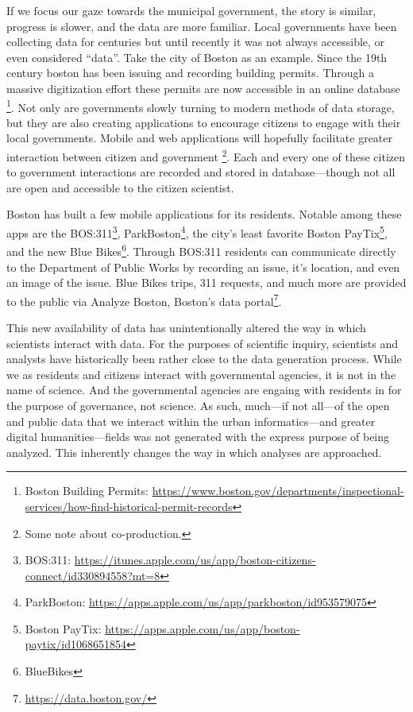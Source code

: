 \documentclass[
]{book}
\begin{document}
If we focus our gaze towards the municipal government, the story is similar, progress is slower, and the data are more familiar. Local governments have been collecting data for centuries but until recently it was not always accessible, or even considered ``data''. Take the city of Boston as an example. Since the 19th century boston has been issuing and recording building permits. Through a massive digitization effort these permits are now accessible in an online database \footnote{Boston Building Permits: \url{https://www.boston.gov/departments/inspectional-services/how-find-historical-permit-records}}. Not only are governments slowly turning to modern methods of data storage, but they are also creating applications to encourage citizens to engage with their local governments. Mobile and web applications will hopefully facilitate greater interaction between citizen and government \footnote{Some note about co-production.}. Each and every one of these citizen to government interactions are recorded and stored in database---though not all are open and accessible to the citizen scientist.

Boston has built a few mobile applications for its residents. Notable among these apps are the BOS:311\footnote{BOS:311: \url{https://itunes.apple.com/us/app/boston-citizens-connect/id330894558?mt=8}}, ParkBoston\footnote{ParkBoston: \url{https://apps.apple.com/us/app/parkboston/id953579075}}, the city's least favorite Boston PayTix\footnote{Boston PayTix: \url{https://apps.apple.com/us/app/boston-paytix/id1068651854}}, and the new Blue Bikes\footnote{BlueBikes}. Through BOS:311 residents can communicate directly to the Department of Public Works by recording an issue, it's location, and even an image of the issue. Blue Bikes trips, 311 requests, and much more are provided to the public via Analyze Boston, Boston's data portal\footnote{\url{https://data.boston.gov/}}.

This new availability of data has unintentionally altered the way in which scientists interact with data. For the purposes of scientific inquiry, scientists and analysts have historically been rather close to the data generation process. While we as residents and citizens interact with governmental agencies, it is not in the name of science. And the governmental agencies are engaing with residents in for the purpose of governance, not science. As such, much---if not all---of the open and public data that we interact within the urban informatics---and greater digital humanities---fields was not generated with the express purpose of being analyzed. This inherently changes the way in which analyses are approached.
\end{document}
